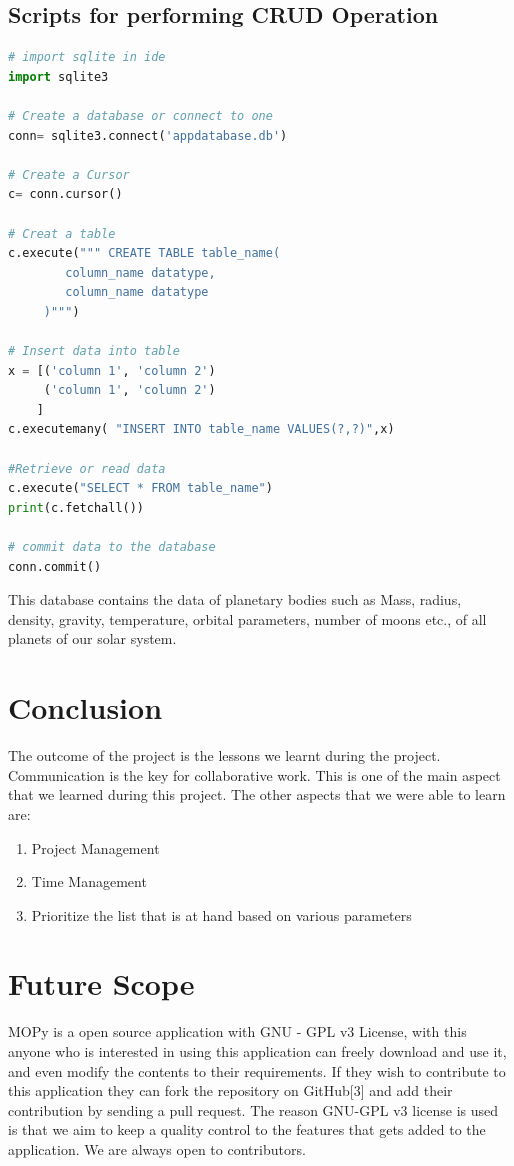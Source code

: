 \documentclass[12pt]{article}
\begin{document}
\subsection{Scripts for performing CRUD Operation}
\begin{lstlisting}[language=python, caption=Script file for performing CRUD Operation]
# import sqlite in ide 
import sqlite3

# Create a database or connect to one 
conn= sqlite3.connect('appdatabase.db')

# Create a Cursor
c= conn.cursor()

# Creat a table
c.execute(""" CREATE TABLE table_name( 
        column_name datatype,
        column_name datatype
     )""")

# Insert data into table
x = [('column 1', 'column 2')
     ('column 1', 'column 2')
    ]
c.executemany( "INSERT INTO table_name VALUES(?,?)",x)

#Retrieve or read data 
c.execute("SELECT * FROM table_name")
print(c.fetchall())

# commit data to the database
conn.commit()
\end{lstlisting}
This database contains the data of planetary bodies such as Mass, radius, density, gravity, temperature, orbital parameters, number of moons etc., of all planets of our solar system.
\section{Conclusion}
The outcome of the project is the lessons we learnt during the project. Communication is the key for collaborative work. This is one of the main aspect that we learned during this project. The other aspects that we were able to learn are:
\begin{enumerate}
\item Project Management
\item Time Management
\item Prioritize the list that is at hand based on various parameters
\end{enumerate}
\section{Future Scope}
\hspace{4em}MOPy is a open source application with GNU - GPL v3 License, with this anyone who is interested in using this application can freely download and use it, and even modify the contents to their requirements. If they wish to contribute to this application they can fork the repository on GitHub[3] and add their contribution by sending a pull request. The reason GNU-GPL v3 license is used is that we aim to keep a quality control to the features that gets added to the application. We are always open to contributors.
\end{document}
